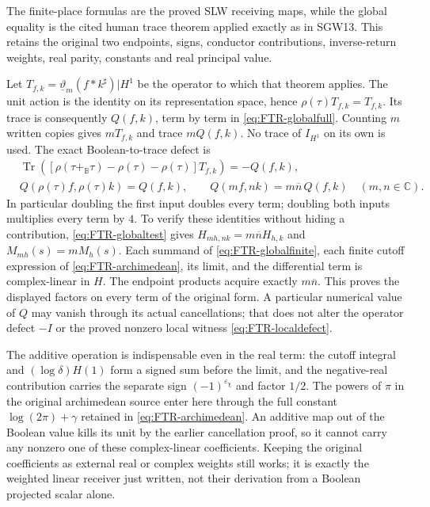 The finite-place formulas are the proved SLW receiving maps,
while the global equality is the cited human trace theorem
applied exactly as in SGW13. This retains the original two
endpoints, signs, conductor contributions, inverse-return
weights, real parity, constants and real principal value.

Let $T_{f,k}=\underline\vartheta_m(f*k^\sharp)|H^1$ be the
operator to which that theorem applies. The unit action is the
identity on its representation space, hence
$\rho(\tau)T_{f,k}=T_{f,k}$. Its trace is consequently
$Q(f,k)$, term by term in \eqref{eq:FTR-globalfull}.
Counting $m$ written copies gives $mT_{f,k}$ and trace
$mQ(f,k)$. No trace of $I_{H^1}$ on its own is used.
The exact Boolean-to-trace defect is
\begin{equation}\tag{FTR22}\label{eq:FTR-globaldefect}
 \begin{aligned}
 &\operatorname{Tr}\!\left(
 [\rho(\tau+_{\mathbb B}\tau)-\rho(\tau)-\rho(\tau)]T_{f,k}
                  \right)=-Q(f,k),\\
 &Q(\rho(\tau)f,\rho(\tau)k)=Q(f,k),\qquad
 Q(mf,nk)=m\overline n\,Q(f,k)\quad(m,n\in\mathbb C).
 \end{aligned}
\end{equation}
In particular doubling the first input doubles every term;
doubling both inputs multiplies every term by $4$.
To verify these identities without hiding a contribution,
\eqref{eq:FTR-globaltest} gives
$H_{mh,nk}=m\overline n H_{h,k}$ and
$M_{mh}(s)=mM_h(s)$. Each summand of
\eqref{eq:FTR-globalfinite}, each finite cutoff expression of
\eqref{eq:FTR-archimedean}, its limit, and the differential term
is complex-linear in $H$. The endpoint products acquire exactly
$m\overline n$. This proves the displayed factors on every
term of the original form. A particular numerical value of
$Q$ may vanish through its actual cancellations; that does not
alter the operator defect $-I$ or the proved nonzero local
witness \eqref{eq:FTR-localdefect}.

The additive operation is indispensable even in the real term:
the cutoff integral and $(\log\delta)H(1)$ form a signed sum
before the limit, and the negative-real contribution carries
the separate sign $(-1)^{\varepsilon_\chi}$ and factor $1/2$.
The powers of $\pi$ in the original archimedean source enter
here through the full constant $\log(2\pi)+\gamma$ retained
in \eqref{eq:FTR-archimedean}. An additive map out of the
Boolean value kills its unit by the earlier cancellation proof,
so it cannot carry any nonzero one of these complex-linear
coefficients. Keeping the original coefficients as external
real or complex weights still works; it is exactly the weighted
linear receiver just written, not their derivation from a
Boolean projected scalar alone.

